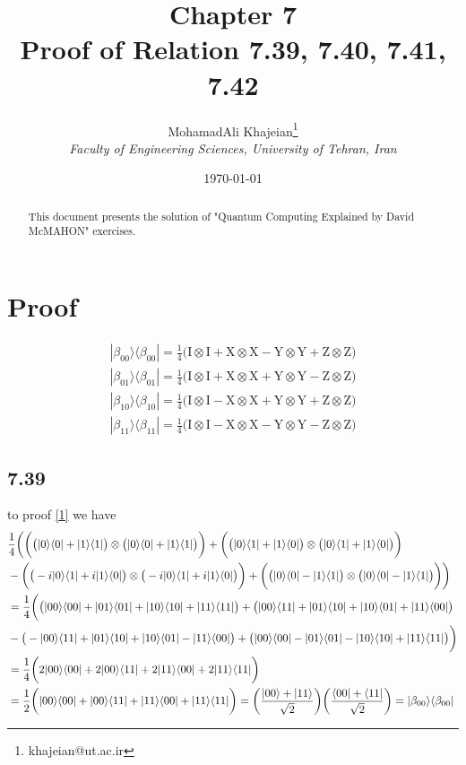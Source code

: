 \documentclass{article}
\title{\textbf{Chapter 7} \\ \small Proof of Relation 7.39, 7.40, 7.41, 7.42}
\author{
    MohamadAli Khajeian\footnote{khajeian@ut.ac.ir} \\ 
    \small \textit{Faculty of Engineering Sciences, University of Tehran, Iran} \\ 
}
\date{\today}
\newcommand{\op}[2]{|#1\rangle \langle#2|}
\newcommand{\tensor}[2]{#1 \otimes #2}
\begin{document}
\maketitle

\begin{abstract}
    This document presents the solution of "Quantum Computing Explained by David McMAHON" exercises.
\end{abstract}

\section*{Proof}
\begin{align}
   \op{\beta_{00}}{\beta_{00}} = \frac{1}{4}\bigg(\tensor{\text{I}}{\text{I}}+\tensor{\text{X}}{\text{X}}-\tensor{\text{Y}}{\text{Y}}+\tensor{\text{Z}}{\text{Z}}\bigg) \label{1} \\
   \op{\beta_{01}}{\beta_{01}} = \frac{1}{4}\bigg(\tensor{\text{I}}{\text{I}}+\tensor{\text{X}}{\text{X}}+\tensor{\text{Y}}{\text{Y}}-\tensor{\text{Z}}{\text{Z}}\bigg) \label{2} \\
   \op{\beta_{10}}{\beta_{10}} = \frac{1}{4}\bigg(\tensor{\text{I}}{\text{I}}-\tensor{\text{X}}{\text{X}}+\tensor{\text{Y}}{\text{Y}}+\tensor{\text{Z}}{\text{Z}}\bigg) \label{3} \\
   \op{\beta_{11}}{\beta_{11}} = \frac{1}{4}\bigg(\tensor{\text{I}}{\text{I}}-\tensor{\text{X}}{\text{X}}-\tensor{\text{Y}}{\text{Y}}-\tensor{\text{Z}}{\text{Z}}\bigg) \label{4}
\end{align}
\subsection*{7.39}
to proof \ref{1} we have
\begin{align*}
   &\frac{1}{4}\bigg(\bigg(\tensor{\big(\op{0}{0}+\op{1}{1}\big)}{\big(\op{0}{0}+\op{1}{1}\big)}\bigg)+\bigg(\tensor{\big(\op{0}{1}+\op{1}{0}\big)}{\big(\op{0}{1}+\op{1}{0}\big)}\bigg)\\&
   -\bigg(\tensor{\big(-i\op{0}{1}+i\op{1}{0}\big)}{\big(-i\op{0}{1}+i\op{1}{0}\big)}\bigg)+\bigg(\tensor{\big(\op{0}{0}-\op{1}{1}\big)}{\big(\op{0}{0}-\op{1}{1}\big)}\bigg)\bigg) \\
   &= \frac{1}{4}\bigg(\big(\op{00}{00}+\op{01}{01}+\op{10}{10}+\op{11}{11}\big)+\big(\op{00}{11}+\op{01}{10}+\op{10}{01}+\op{11}{00}\big)\\
   &-\big(-\op{00}{11}+\op{01}{10}+\op{10}{01}-\op{11}{00}\big)+\big(\op{00}{00}-\op{01}{01}-\op{10}{10}+\op{11}{11}\big)\bigg)\\
   &=\frac{1}{4}\bigg(2\op{00}{00}+2\op{00}{11}+2\op{11}{00}+2\op{11}{11}\bigg)\\
   &=\frac{1}{2}\bigg(\op{00}{00}+\op{00}{11}+\op{11}{00}+\op{11}{11}\bigg) = \bigg(\frac{\ket{00}+\ket{11}}{\sqrt{2}}\bigg)\bigg(\frac{\bra{00}+\bra{11}}{\sqrt{2}}\bigg) = \op{\beta_{00}}{\beta_{00}}
\end{align*}
\end{document}
